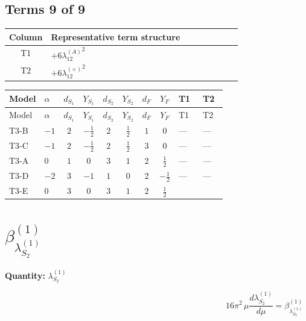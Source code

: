 \documentclass[8pt]{article}
\begin{document}
\begin{landscape}
\subsection*{Terms 9 of 9}
\begin{center}
\begin{tabular}{@{}c >{\raggedright\arraybackslash}p{0.82\linewidth}@{}}
\toprule
Column & Representative term structure \\
\midrule
T1 & \(\displaystyle +6 {\lambda_{12}^{(A)}}^2\) \\
\midrule
T2 & \(\displaystyle +6 {\lambda_{12}^{(\times)}}^2\) \\
\midrule
\bottomrule
\end{tabular}
\end{center}
\smallskip
\tiny
\begin{longtable}{@{}llcccccc >{\raggedright\arraybackslash}p{0.21\linewidth} >{\raggedright\arraybackslash}p{0.21\linewidth}@{}}
\toprule
Model & $\alpha$ & $d_{S_1}$ & $Y_{S_1}$ & $d_{S_2}$ & $Y_{S_2}$ & $d_F$ & $Y_F$ & T1 & T2 \\
\midrule
\endfirsthead
\toprule
Model & $\alpha$ & $d_{S_1}$ & $Y_{S_1}$ & $d_{S_2}$ & $Y_{S_2}$ & $d_F$ & $Y_F$ & T1 & T2 \\
\midrule
\endhead
T3-B & $-1$ & $2$ & $-\frac{1}{2}$ & $2$ & $\frac{1}{2}$ & $1$ & $0$ & --- & --- \\
\midrule
T3-C & $-1$ & $2$ & $-\frac{1}{2}$ & $2$ & $\frac{1}{2}$ & $3$ & $0$ & --- & --- \\
\midrule
T3-A & $0$ & $1$ & $0$ & $3$ & $1$ & $2$ & $\frac{1}{2}$ & --- & --- \\
\midrule
T3-D & $-2$ & $3$ & $-1$ & $1$ & $0$ & $2$ & $-\frac{1}{2}$ & --- & --- \\
\midrule
T3-E & $0$ & $3$ & $0$ & $3$ & $1$ & $2$ & $\frac{1}{2}$ & \scriptsize\adjustbox{max width=\linewidth}{$\begin{gathered} +6 {\lambda_{12}^{(A)}}^2\end{gathered}$} & \scriptsize\adjustbox{max width=\linewidth}{$\begin{gathered} +6 {\lambda_{12}^{(\times)}}^2\end{gathered}$} \\
\midrule
\bottomrule
\end{longtable}
\clearpage
\section*{$\beta_{\lambda_{S_2}^{(1)}}^{(1)}$}
\noindent\textbf{Quantity: }$\lambda_{S_2}^{(1)}$\par\smallskip
\[16\pi^2\,\mu\frac{d \lambda_{S_2}^{(1)}}{d\mu}=\beta_{\lambda_{S_2}^{(1)}}^{(1)}\]

\end{landscape}
\end{document}
